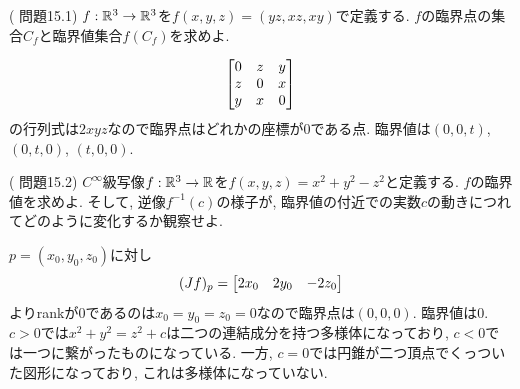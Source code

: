 \begin{egprob} (\cite{matsumoto} 問題15.1) $f:\mathbb{R}^3\to \mathbb{R}^3$を$f(x,y,z) = (yz,xz,xy)$で定義する. $f$の臨界点の集合$C_f$と臨界値集合$f(C_f)$を求めよ.
\end{egprob}
\begin{egans}
\[
\begin{bmatrix}
0&z&y \\
z&0&x \\
y&x&0
\end{bmatrix}
\]
の行列式は$2xyz$なので臨界点はどれかの座標が0である点. 臨界値は$(0,0,t)$, $(0,t,0)$, $(t,0,0)$.
\end{egans}


\begin{egprob} (\cite{matsumoto} 問題15.2)
$C^{\infty}$級写像$f:\mathbb{R}^3\to \mathbb{R}$を$f(x,y,z) = x^2+y^2 - z^2$と定義する. $f$の臨界値を求めよ. そして, 逆像$f^{-1}(c)$の様子が, 臨界値の付近での実数$c$の動きにつれてどのように変化するか観察せよ.
\end{egprob}

\begin{egans} $p=(x_0,y_0,z_0)$に対し
\[(Jf)_{p} = \begin{bmatrix}2x_0 & 2y_0 & -2z_0\end{bmatrix}\]
よりrankが0であるのは$x_0=y_0=z_0=0$なので臨界点は$(0,0,0)$. 臨界値は$0$. $c> 0$では$x^2+y^2=z^2+c$は二つの連結成分を持つ多様体になっており, $c<0$では一つに繋がったものになっている. 一方, $c=0$では円錐が二つ頂点でくっついた図形になっており, これは多様体になっていない.
\end{egans}





\clearpage

